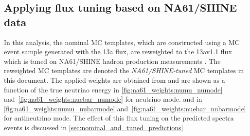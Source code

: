 \subsection {Applying flux tuning based on NA61/SHINE data}
\label{sec:na61_weights}

In this analysis, the nominal MC templates, which are constructed using a MC event sample generated with the 13a flux,
are reweighted to the 13av1.1 flux which is tuned on NA61/SHINE hadron production measurements \cite{FluxTuning13a}\cite{NA61/SHINET2K2014}.
The reweighted MC templates are denoted the \textit{NA61/SHINE-tuned} MC templates in this document.
The applied weights are obtained from \cite{FluxTuning13a} and are shown as a function of the true neutrino energy 
in \cref{fig:na61_weights:numu_numode} and~\ref{fig:na61_weights:nuebar_numode} for neutrino mode.
and
in \cref{fig:na61_weights:numu_nubarmode} and~\ref{fig:na61_weights:nuebar_nubarmode} for antineutrino mode.
The effect of this flux tuning on the predicted spectra events is discussed in \cref{sec:nominal_and_tuned_predictions} 

